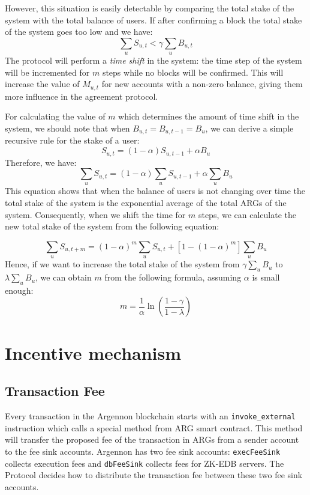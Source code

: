 \documentclass[a4paper]{report}
\begin{document}
    However, this situation is easily detectable by comparing the total stake of the system with the total balance of
    users. If after confirming a block the total stake of the system goes too low and we have:
    \[
        \sum_{u}S_{u,t} < \gamma \sum_{u}B_{u,t}
    \]
    The protocol will perform a \emph{time shift} in the system: the time step of the system
    will be incremented for \(m\) steps while no blocks will be confirmed. This will increase the value of \(M_{u,t}\)
    for new accounts with a non-zero balance, giving them more influence in the agreement protocol.

    For calculating the value of \(m\) which determines the amount of time shift in the system, we should note that when
    \(B_{u,t} = B_{u, t-1} = B_u\), we can derive a simple recursive rule for the stake of a user:
    \[
        S_{u,t} = (1 - \alpha) S_{u,t-1} + \alpha B_u
    \]
    Therefore, we have:
    \[
        \sum_{u}S_{u,t} = (1 - \alpha) \sum_{u}S_{u,t - 1} + \alpha \sum_{u}B_u
    \]
    This equation shows that when the balance of users is not changing over time the total stake of the system is the
    exponential average of the total ARGs of the system. Consequently, when we shift the time for \(m\) steps, we can
    calculate the new total stake of the system from the following equation:

    \[
        \sum_{u}S_{u,t+m} = (1 - \alpha)^{m}\sum_{u}S_{u,t} + [1 - (1 - \alpha)^{m}]\sum_{u}B_u
    \]
    Hence, if we want to increase the total stake of the system from \(\gamma \sum_{u}B_u\) to \(\lambda \sum_{u}B_u\),
    we can obtain \(m\) from the following formula, assuming \(\alpha\) is small enough:
    \[
        m = \frac{1}{\alpha} \ln \left(\frac{1 - \gamma}{1 - \lambda}\right)
    \]


    \section{Incentive mechanism}\label{sec:incentive-mechanism}

    \subsection{Transaction Fee}\label{subsec:transaction-fee}

    Every transaction in the Argennon blockchain starts with an \texttt{invoke\_external} instruction which calls a
    special method from ARG smart contract. This method will transfer the proposed fee of the transaction in ARGs
    from a sender account to the fee sink accounts. Argennon has two fee sink accounts: \texttt{execFeeSink} collects
    execution fees and \texttt{dbFeeSink} collects fees for ZK-EDB servers. The Protocol decides how to distribute the
    transaction fee between these two fee sink accounts.
\end{document}
